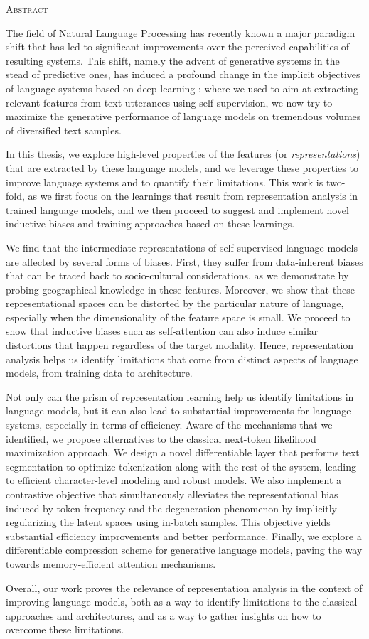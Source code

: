 \begin{center}
  \textsc{Abstract}
\end{center}
%
\noindent
%

The field of Natural Language Processing has recently known a major paradigm shift that has led to significant improvements over the perceived capabilities of resulting systems. This shift, namely the advent of generative systems in the stead of predictive ones, has induced a profound change in the implicit objectives of language systems based on deep learning : where we used to aim at extracting relevant features from text utterances using self-supervision, we now try to maximize the generative performance of language models on tremendous volumes of diversified text samples.

In this thesis, we explore high-level properties of the features (or \textit{representations}) that are extracted by these language models, and we leverage these properties to improve language systems and to quantify their limitations. This work is two-fold, as we first focus on the learnings that result from representation analysis in trained language models, and we then proceed to suggest and implement novel inductive biases and training approaches based on these learnings.

We find that the intermediate representations of self-supervised language models are affected by several forms of biases. First, they suffer from data-inherent biases that can be traced back to socio-cultural considerations, as we demonstrate by probing geographical knowledge in these features. Moreover, we show that these representational spaces can be distorted by the particular nature of language, especially when the dimensionality of the feature space is small. We proceed to show that inductive biases such as self-attention can also induce similar distortions that happen regardless of the target modality. Hence, representation analysis helps us identify limitations that come from distinct aspects of language models, from training data to architecture.

Not only can the prism of representation learning help us identify limitations in language models, but it can also lead to substantial improvements for language systems, especially in terms of efficiency. Aware of the mechanisms that we identified, we propose alternatives to the classical next-token likelihood maximization approach. We design a novel differentiable layer that performs text segmentation to optimize tokenization along with the rest of the system, leading to efficient character-level modeling and robust models. We also implement a contrastive objective that simultaneously alleviates the representational bias induced by token frequency and the degeneration phenomenon by implicitly regularizing the latent spaces using in-batch samples. This objective yields substantial efficiency improvements and better performance. Finally, we explore a differentiable compression scheme for generative language models, paving the way towards memory-efficient attention mechanisms.

Overall, our work proves the relevance of representation analysis in the context of improving language models, both as a way to identify limitations to the classical approaches and architectures, and as a way to gather insights on how to overcome these limitations.
